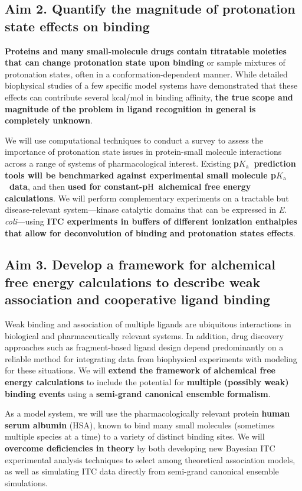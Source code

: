 \documentclass[10pt,final]{article}
\newcommand{\pKa}{p$K_\mathrm{a}$\ }
\newcommand{\pH}{p$\mathrm{H}$\ }
\begin{document}
\subsection*{Aim 2. Quantify the magnitude of protonation state effects on binding}
\textbf{Proteins and many small-molecule drugs contain titratable moieties that can change protonation state upon binding} or sample mixtures of protonation states, often in a conformation-dependent manner.
While detailed biophysical studies of a few specific model systems have demonstrated that these effects can contribute several kcal/mol in binding affinity, \textbf{the true scope and magnitude of the problem in ligand recognition in general is completely unknown}.

We will use computational techniques to conduct a survey to assess the importance of protonation state issues in protein-small molecule interactions across a range of systems of pharmacological interest.
Existing \textbf{ \pKa prediction tools will be benchmarked against experimental small molecule \pKa data}, and then \textbf{ used for constant-\pH alchemical free energy calculations}.
We will perform complementary experiments on a tractable but disease-relevant system---kinase catalytic domains that can be expressed in \textit{E. coli}---using \textbf{ ITC experiments in buffers of different ionization enthalpies that allow for deconvolution of binding and protonation states effects}.

\subsection*{Aim 3. Develop a framework for alchemical free energy calculations to describe weak association and cooperative ligand binding}
Weak binding and association of multiple ligands are ubiquitous interactions in biological and pharmaceutically relevant systems.
In addition, drug discovery approaches such as fragment-based ligand design depend predominantly on a reliable method for integrating data from biophysical experiments with modeling for these situations.
We will \textbf{ extend the framework of alchemical free energy calculations}  to include the potential for \textbf{ multiple (possibly weak) binding events } using a \textbf{ semi-grand canonical ensemble formalism}.

As a model system, we will use the pharmacologically relevant protein \textbf{ human serum albumin } (HSA), known to bind many small molecules (sometimes multiple species at a time) to a variety of distinct binding sites.
We will  \textbf{ overcome deficiencies in theory } by both developing new Bayesian ITC experimental analysis techniques to select among theoretical association models, as well as simulating ITC data directly from semi-grand canonical ensemble simulations.
\end{document}
